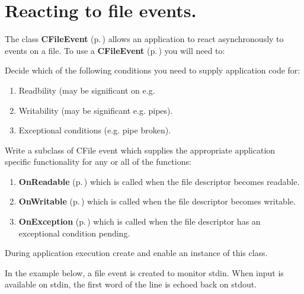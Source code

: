 \section{Reacting to file events.}\label{FileEvents}


The class {\bf CFile\-Event} {\rm (p.\,\pageref{classCFileEvent})} allows an application to react asynchronously to events on a file. To use a {\bf CFile\-Event} {\rm (p.\,\pageref{classCFileEvent})} you will need to:\begin{CompactItemize}
\item 
Decide which of the following conditions you need to supply  application code for:\begin{enumerate}
\item 
Readbility (may be significant on e.g. \item 
Writability (may be significant e.g. pipes).\item 
Exceptional conditions (e.g. pipe broken).\end{enumerate}
\item 
Write a subclass of CFile event which supplies the appropriate application specific functionality for any or all of the functions:\begin{enumerate}
\item 
{\bf On\-Readable} {\rm (p.\,\pageref{classCFileEvent_a15})} which is called when the file descriptor becomes readable.\item 
{\bf On\-Writable} {\rm (p.\,\pageref{classCFileEvent_a16})} which  is called when the file descriptor becomes writable.\item 
{\bf On\-Exception} {\rm (p.\,\pageref{classCFileEvent_a17})} which is called when the file descriptor has an exceptional condition pending.\end{enumerate}
\item 
During application execution create and enable an instance of this class.\end{CompactItemize}
In the example below, a file event is created to monitor stdin. When input is available on stdin, the first word of the line is echoed back on stdout.



